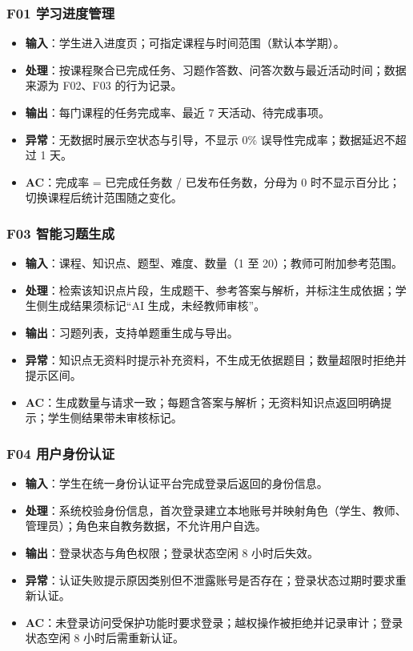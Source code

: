 \documentclass[12pt,a4paper]{ctexart}
\begin{document}
\subsubsection{F01 学习进度管理}
\label{srs-f01}

\begin{itemize}
  \item \textbf{输入}：学生进入进度页；可指定课程与时间范围（默认本学期）。
  \item \textbf{处理}：按课程聚合已完成任务、习题作答数、问答次数与最近活动时间；数据来源为 F02、F03 的行为记录。
  \item \textbf{输出}：每门课程的任务完成率、最近 7 天活动、待完成事项。
  \item \textbf{异常}：无数据时展示空状态与引导，不显示 0\% 误导性完成率；数据延迟不超过 1 天。
  \item \textbf{AC}：完成率 = 已完成任务数 / 已发布任务数，分母为 0 时不显示百分比；切换课程后统计范围随之变化。
\end{itemize}

\subsubsection{F03 智能习题生成}
\label{srs-f03}

\begin{itemize}
  \item \textbf{输入}：课程、知识点、题型、难度、数量（1 至 20）；教师可附加参考范围。
  \item \textbf{处理}：检索该知识点片段，生成题干、参考答案与解析，并标注生成依据；学生侧生成结果须标记“AI 生成，未经教师审核”。
  \item \textbf{输出}：习题列表，支持单题重生成与导出。
  \item \textbf{异常}：知识点无资料时提示补充资料，不生成无依据题目；数量超限时拒绝并提示区间。
  \item \textbf{AC}：生成数量与请求一致；每题含答案与解析；无资料知识点返回明确提示；学生侧结果带未审核标记。
\end{itemize}

\subsubsection{F04 用户身份认证}
\label{srs-f04}

\begin{itemize}
  \item \textbf{输入}：学生在统一身份认证平台完成登录后返回的身份信息。
  \item \textbf{处理}：系统校验身份信息，首次登录建立本地账号并映射角色（学生、教师、管理员）；角色来自教务数据，不允许用户自选。
  \item \textbf{输出}：登录状态与角色权限；登录状态空闲 8 小时后失效。
  \item \textbf{异常}：认证失败提示原因类别但不泄露账号是否存在；登录状态过期时要求重新认证。
  \item \textbf{AC}：未登录访问受保护功能时要求登录；越权操作被拒绝并记录审计；登录状态空闲 8 小时后需重新认证。
\end{itemize}
\end{document}
